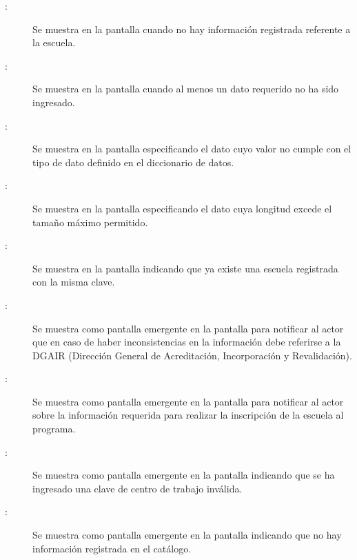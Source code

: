     \begin{description}
    \item[:] Se muestra en la pantalla  cuando no hay información registrada referente a la escuela.
    
    \item[:] Se muestra en la pantalla  cuando al menos un dato requerido no ha sido ingresado.

    \item[:] Se muestra en la pantalla  especificando el dato cuyo valor no cumple con el tipo de dato definido en el diccionario de datos.

    \item[:] Se muestra en la pantalla  especificando el dato cuya longitud excede el tamaño máximo permitido.

    \item[:] Se muestra en la pantalla  indicando que ya existe una escuela registrada con la misma clave.

    \item[:] Se muestra  como pantalla emergente en la pantalla  para notificar al actor que en caso de haber inconsistencias en la información debe referirse a la DGAIR (Dirección General de Acreditación, Incorporación y Revalidación).
    
    \item[:] Se muestra como pantalla emergente en la pantalla  para notificar al actor sobre la información requerida para realizar la inscripción de la escuela al programa.
    
	\item[:] Se muestra como pantalla emergente en la pantalla  indicando que se ha ingresado una clave de centro de trabajo inválida.
	\item[:] Se muestra como pantalla emergente en la pantalla  indicando que no hay información registrada en el catálogo.	  
    \end{description}
